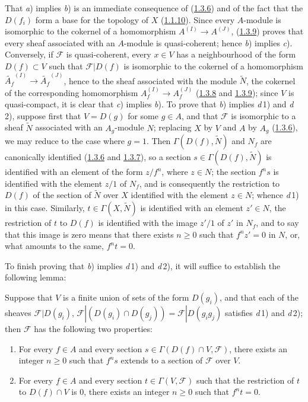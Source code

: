 That \textit{a}) implies \textit{b}) is an immediate consequence of
(\hyperref[I.1.3.6]{1.3.6}) and of the fact that the $D(f_i)$ form a base
for the topology of $X$ (\hyperref[I.1.1.10]{1.1.10}). Since every
$A$-module is isomorphic to the cokernel of a homomorphism
$A^{(I)}\to A^{(J)}$, (\hyperref[I.1.3.9]{1.3.9}) proves that every sheaf
associated with an $A$-module is quasi-coherent; hence \textit{b}) implies
\textit{c}). Conversely, if $\mathscr{F}$ is quasi-coherent, every $x\in V$
has a neighbourhood of the form $D(f)\subset V$ such that $\mathscr{F}|D(f)$
is isomorphic to the cokernel of a homomorphism
$\widetilde{A_f}^{(I)}\to\widetilde{A_f}^{(J)}$, hence to the sheaf
associated with the module $\widetilde{N}$, the cokernel of the corresponding
homomorphism $A_f^{(I)}\to A_f^{(J)}$
(\hyperref[I.1.3.8]{1.3.8} and \hyperref[I.1.3.9]{1.3.9}); since $V$
is quasi-compact, it is clear that \textit{c}) implies \textit{b}).
To prove that \textit{b}) implies \textit{d}\,1) and \textit{d}\,2),
suppose first that $V=D(g)$ for some $g\in A$, and that $\mathscr{F}$ is
isomorphic to a sheaf $\widetilde{N}$ associated with an $A_g$-module $N$;
replacing $X$ by $V$ and $A$ by $A_g$
(\hyperref[I.1.3.6]{1.3.6}), we may reduce to the case where $g=1$. Then
$\Gamma(D(f),\widetilde{N})$ and $N_f$ are canonically identified
(\hyperref[I.1.3.6]{1.3.6} and \hyperref[I.1.3.7]{1.3.7}), so a
section $s\in\Gamma(D(f),\widetilde{N})$ is identified with an element of
the form $z/f^n$, where $z\in N$; the section $f^n s$ is identified with the
element $z/1$ of $N_f$, and is consequently the restriction to $D(f)$ of the
section of $\widetilde{N}$ over $X$ identified with the element $z\in N$;
whence \textit{d}\,1) in this case. Similarly, $t\in\Gamma(X,\widetilde{N})$
is identified with an element $z'\in N$, the restriction of $t$ to $D(f)$ is
identified with the image $z'/1$ of $z'$ in $N_f$, and to say that this image
is zero means that there exists $n\geq0$ such that $f^n z'=0$ in $N$, or,
what amounts to the same, $f^n t=0$.

To finish proving that \textit{b}) implies \textit{d}\,1) and
\textit{d}\,2), it will suffice to establish the following lemma:

\begin{lemma}[1.4.1.1]
\label{I.1.4.1.1}
Suppose that $V$ is a finite union of sets of the form $D(g_i)$, and
that each of the sheaves $\mathscr{F}|D(g_i)$,
$\mathscr{F}|(D(g_i)\cap D(g_j))=\mathscr{F}|D(g_i g_j)$ satisfies
\textit{d}\,1) and \textit{d}\,2); then $\mathscr{F}$ has the following two
properties:
\begin{enumerate}
  \item[\textit{d}'\,1)] For every $f\in A$ and every section
  $s\in\Gamma(D(f)\cap V,\mathscr{F})$, there exists an integer $n\geq0$
  such that $f^n s$ extends to a section of $\mathscr{F}$ over $V$.
  \item[\textit{d}'\,2)] For every $f\in A$ and every section
  $t\in\Gamma(V,\mathscr{F})$ such that the restriction of $t$ to
  $D(f)\cap V$ is $0$, there exists an integer $n\geq0$ such that $f^n t=0$.
\end{enumerate}
\end{lemma}


